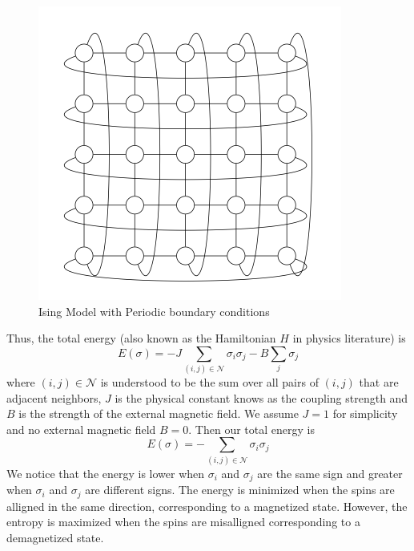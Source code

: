 \documentclass{article}
\begin{document}
    \begin{figure}[ht]
        \includegraphics[width=\columnwidth]{diagrams/loopy_ising_model.png}
        \caption{Ising Model with Periodic boundary conditions}
        \label{fig:1}
    \end{figure}
    
    
    Thus, the total energy (also known as the Hamiltonian $H$ in physics literature) is
\begin{equation}
    E(\sigma) = - J \sum_{(i,j) \in \mathcal{N}} \sigma_i \sigma_j - B \sum_{j} \sigma_j
\end{equation}
where $(i,j) \in \mathcal{N}$ is understood to be the sum over all pairs of $(i,j)$ that are adjacent neighbors,
$J$ is the physical constant knows as the coupling strength and $B$ is the strength of the external magnetic field.
We assume $J=1$ for simplicity and no external magnetic field $B=0$. Then our total energy is
\begin{equation}
    E(\sigma) = - \sum_{(i,j) \in \mathcal{N}} \sigma_i \sigma_j 
\end{equation} 
We notice that the energy is lower when $\sigma_i$ and $\sigma_j$ are the same sign and greater when $\sigma_i$ and $\sigma_j$ 
are different signs. The energy is minimized when the spins are alligned in the same direction, corresponding to a magnetized state.
However, the entropy is maximized when the spins are misalligned corresponding to a demagnetized state.
\end{document}
